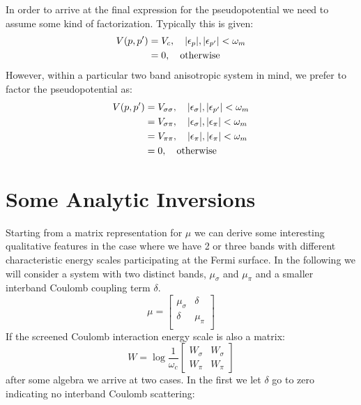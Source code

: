 In order to arrive at the final expression for the pseudopotential 
we need to assume some kind of factorization. Typically this is given:
%
\begin{align}
V(p,p') & =  V_{c}, \quad |\epsilon_{p}|, |\epsilon_{p'}| < \omega_{m} \nonumber \\
        & =  0, \quad {\rm otherwise}
\end{align}
%
However, within a particular two band anisotropic system in mind, we prefer to factor 
the pseudopotential as:
%
\begin{align}
V(p,p') & =  V_{\sigma \sigma}, \quad |\epsilon_{\sigma}|, |\epsilon_{p'}| < \omega_{m} \nonumber \\
        & =  V_{\sigma\pi}, \quad |\epsilon_{\sigma}|, |\epsilon_{\pi}| < \omega_{m} \nonumber \\
        & =  V_{\pi\pi}, \quad |\epsilon_{\pi}|, |\epsilon_{\pi}|  < \omega_{m} \nonumber \\
        & =  0, \quad {\rm otherwise}
\end{align}
%

\section{Some Analytic Inversions}
%
Starting from a matrix representation for 
$\mu$ we can derive some interesting qualitative features in the case 
where we have 2 or three bands with different characteristic energy 
scales participating at the Fermi surface. In the following we will
consider a system with two distinct bands, $\mu_{\sigma}$ and $\mu_{\pi}$ and a smaller interband
Coulomb coupling term $\delta$.
%
\begin{equation}
\mu = 
\begin{bmatrix}
\mu_{\sigma} & \delta \\
\delta & \mu_{\pi}\\
\end{bmatrix}
\end{equation}
%
If the screened Coulomb interaction energy scale is also a matrix:
%
\begin{equation}
W = \log \frac{1}{\omega_{c}}
\begin{bmatrix}
W_{\sigma} & W_{\sigma} \\
W_{\pi} & W_{\pi}
\end{bmatrix}
\end{equation}
%
after some algebra we arrive at two cases. In the first we let $\delta$
go to zero indicating no interband Coulomb scattering:


